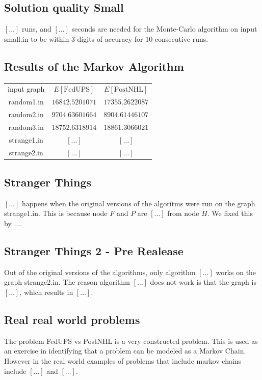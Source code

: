\documentclass{tufte-handout}
\begin{document}
\subsection{Solution quality Small}

$[\ldots]$ runs, and $[\ldots]$ seconds are needed for the Monte-Carlo algorithm on input small.in to be within $3$ digits of accuracy for 10 consecutive runs.

\subsection{Results of the Markov Algorithm}

\begin{tabular}{c c c}
    input graph & $E[\text{FedUPS}]$ & $E[\text{PostNHL}]$ \\
    random1.in & $16842.5201071$ & $17355.2622087$ \\
    random2.in & $9704.63601664$ & $8904.61446107$ \\
    random3.in & $18752.6318914$ & $18861.3066021$ \\
    strange1.in & $[\ldots]$ & $[\ldots]$ \\
    strange2.in & $[\ldots]$ & $[\ldots]$ \\
\end{tabular}

\subsection{Stranger Things}
$[\ldots]$ happens when the original versions of the algoritms were run on the graph strange1.in. 
This is because node $F$ and $P$ are $[\ldots]$ from node $H$. We fixed this by ${\ldots}$.

\subsection{Stranger Things 2 - Pre Realease}
Out of the original versions of the algorithms, only algorithm $[\ldots]$ works on the graph strange2.in. 
The reason algorithm $[\ldots]$ does not work is that the graph is $[\ldots]$, which results in $[\ldots]$.


\subsection{Real real world problems}
The problem FedUPS vs PostNHL is a very constructed problem. 
This is used as an exercise in identifying that a problem can be modeled as a Markov Chain.
However in the real world examples of problems that include markov chains include $[\ldots]$ and $[\ldots]$.
\end{document}
